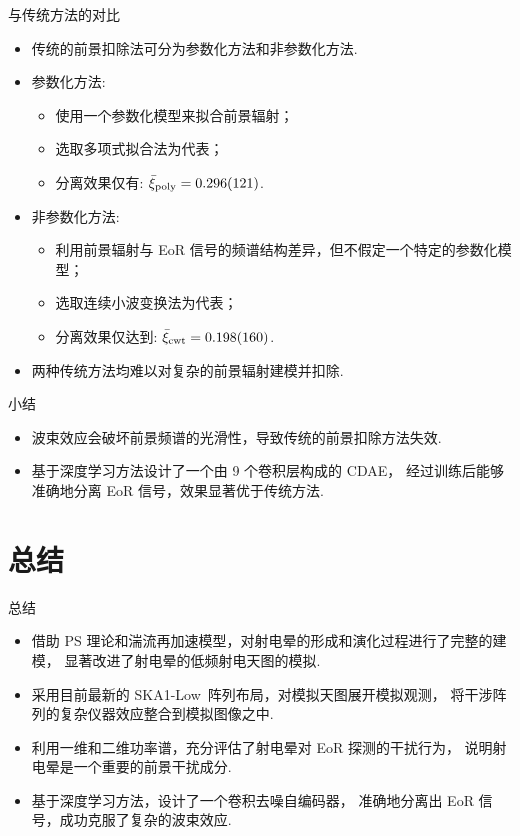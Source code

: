 \documentclass{beamer}
\newcommand{\R}[1]{\text{#1}}  %
\begin{document}
\begin{frame}{与传统方法的对比}
  \begin{itemize}
    \item 传统的前景扣除法可分为\alert{参数化方法}和\alert{非参数化方法}.
    \item 参数化方法:
      \begin{itemize}
        \item 使用一个参数化模型来拟合前景辐射；
        \item 选取\alert{多项式拟合法}为代表；
        \item 分离效果仅有: $\bar{\xi}_{\R{poly}} = \num{0.296 +- 0.121}$.
      \end{itemize}
    \item 非参数化方法:
      \begin{itemize}
        \item 利用前景辐射与 EoR 信号的频谱结构差异，但不假定一个特定的参数化模型；
        \item 选取\alert{连续小波变换法}\cite{gu2013}为代表；
        \item 分离效果仅达到: $\bar{\xi}_{\R{cwt}} = \num{0.198 +- 0.160}$.
      \end{itemize}
    \item 两种传统方法均难以对复杂的前景辐射建模并扣除.
  \end{itemize}
\end{frame}

\begin{frame}{小结}
  \begin{itemize}
    \item 波束效应会破坏前景频谱的光滑性，导致传统的前景扣除方法失效.
    \item 基于深度学习方法设计了一个由 9 个卷积层构成的 CDAE，
      经过训练后能够准确地分离 EoR 信号，效果显著优于传统方法.
  \end{itemize}
\end{frame}


\section{总结}

\begin{frame}{总\cspace{}结}
  \begin{itemize}
    \item 借助 PS 理论和湍流再加速模型，对射电晕的形成和演化过程进行了完整的建模，
      显著改进了射电晕的低频射电天图的模拟.
    \item 采用目前最新的 SKA1-Low~阵列布局，对模拟天图展开模拟观测，
      将干涉阵列的复杂仪器效应整合到模拟图像之中.
    \item 利用一维和二维功率谱，充分评估了射电晕对 EoR 探测的干扰行为，
      说明射电晕是一个重要的前景干扰成分.
    \item 基于深度学习方法，设计了一个卷积去噪自编码器，
      准确地分离出 EoR 信号，成功克服了复杂的波束效应.
  \end{itemize}
\end{frame}
\end{document}
